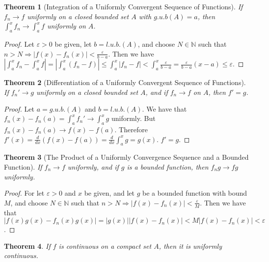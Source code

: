 \documentclass[crop=false,class=book]{standalone}
\theoremstyle{mystyle}
\newtheorem{theorem}{Theorem}[section]
\begin{document}
\begin{theorem}[Integration of a Uniformly Convergent Sequence of Functions] If $f_n\rightarrow f$ uniformly on a closed bounded set $A$ with $g.u.b(A)=a$, then $\int_{a}^{x} f_n \rightarrow \int_{a}^{x} f$ uniformly on $A$.
\end{theorem}
\begin{proof}
Let $\varepsilon >0$ be given, let $b=l.u.b.(A)$, and choose $N\in\mathbb{N}$ such that $n>N\Rightarrow |f(x)-f_n(x)|<\frac{\varepsilon}{b-a}$. Then we have $|\int_{a}^{x} f_n - \int_{a}^{x} f| = |\int_{a}^{x} (f_n-f)| \leq \int_{a}^{x} |f_n-f| < \int_{a}^{x} \frac{\varepsilon}{b-a}= \frac{\varepsilon}{b-a}(x-a) \leq \varepsilon$. 
\end{proof}
\begin{theorem}[Differentiation of a Uniformly Convergent Sequence of Functions]
If $f_n'\rightarrow g$ uniformly on a closed bounded set $A$, and if $f_n \rightarrow f$ on $A$, then $f' = g$.
\end{theorem}
\begin{proof} Let $a=g.u.b.(A)$ and $b=l.u.b.(A)$. We have that $f_n(x) - f_n(a) = \int_{a}^{x}f_n' \rightarrow \int_{a}^{x}g$ uniformly. But $f_n(x)-f_n(a) \rightarrow f(x) - f(a)$. Therefore $f'(x)=\frac{d}{dx}(f(x)-f(a)) = \frac{d}{dx}\int_{a}^{x} g = g(x)$. $f' = g$.
\end{proof}
\begin{theorem}[The Product of a Uniformly Convergence Sequence and a Bounded Function]  If $f_n \rightarrow f$ uniformly, and if $g$ is a bounded function, then $f_n g \rightarrow fg$ uniformly.
\end{theorem}
\begin{proof}
For let $\varepsilon>0$ and $x$ be given, and let $g$ be a bounded function with bound $M$, and choose $N\in\mathbb{N}$ such that $n>N \Rightarrow |f(x)-f_n(x)|<\frac{\varepsilon}{M}$. Then we have that $|f(x)g(x)-f_n(x)g(x)| = |g(x)||f(x)-f_n(x)| < M|f(x)-f_n(x)| <\varepsilon$.
\end{proof}
\begin{theorem}
If $f$ is continuous on a compact set $A$, then it is uniformly continuous.
\end{theorem}
\end{document}
